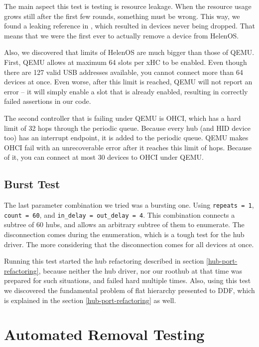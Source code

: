 The main aspect this test is testing is resource leakage. When the resource
usage grows still after the first few rounds, something must be wrong. This
way, we found a leaking reference in , which resulted in devices
never being dropped. That means that we were the first ever to actually remove
a device from HelenOS.

Also, we discovered that limits of HelenOS are much bigger than those of QEMU.
First, QEMU allows at maximum 64 slots per xHC to be enabled. Even though there
are 127 valid USB addresses available, you cannot connect more than 64 devices
at once. Even worse, after this limit is reached, QEMU will not report an error
-- it will simply enable a slot that is already enabled, resulting in correctly
failed assertions in our code.

The second controller that is failing under QEMU is OHCI, which has a hard
limit of 32 hops through the periodic queue. Because every hub (and HID device
too) has an interrupt endpoint, it is added to the periodic queue. QEMU makes
OHCI fail with an unrecoverable error after it reaches this limit of hops.
Because of it, you can connect at most 30 devices to OHCI under QEMU.

\subsection{Burst Test}

The last parameter combination we tried was a bursting one. Using
\texttt{repeats = 1}, \texttt{count = 60}, and \texttt{in\_delay = out\_delay
= 4}. This combination connects a subtree of 60 hubs, and allows an arbitrary
subtree of them to enumerate. The disconnection comes during the enumeration,
which is a tough test for the hub driver. The more considering that the
disconnection comes for all devices at once.

Running this test started the hub refactoring described in section
\ref{hub-port-refactoring}, because neither the hub driver, nor our roothub at
that time was prepared for such situations, and failed hard multiple times.
Also, using this test we discovered the fundamental problem of flat hierarchy
presented to DDF, which is explained in the section \ref{hub-port-refactoring}
as well.

\section{Automated Removal Testing}

